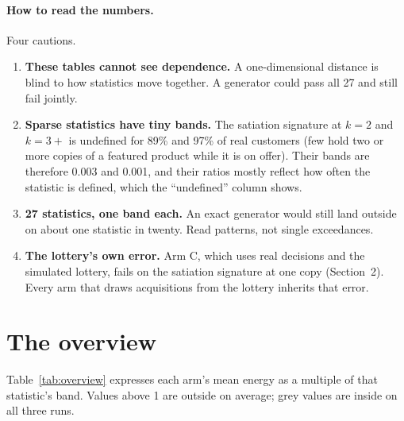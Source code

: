 \documentclass[11pt]{article}
\begin{document}
\paragraph{How to read the numbers.} Four cautions.
\begin{enumerate}
\item \textbf{These tables cannot see dependence.} A one-dimensional distance
  is blind to how statistics move together. A generator could pass all 27 and
  still fail jointly.
\item \textbf{Sparse statistics have tiny bands.} The satiation signature at
  $k = 2$ and $k = 3{+}$ is undefined for 89\% and 97\% of real customers (few
  hold two or more copies of a featured product while it is on offer). Their
  bands are therefore 0.003 and 0.001, and their ratios mostly reflect how often
  the statistic is defined, which the ``undefined'' column shows.
\item \textbf{27 statistics, one band each.} An exact generator would still land
  outside on about one statistic in twenty. Read patterns, not single
  exceedances.
\item \textbf{The lottery's own error.} Arm C, which uses real decisions and the
  simulated lottery, fails on the satiation signature at one copy (Section~2).
  Every arm that draws acquisitions from the lottery inherits that error.
\end{enumerate}

\section{The overview}

Table~\ref{tab:overview} expresses each arm's mean energy as a multiple of that
statistic's band. Values above 1 are outside on average; grey values are inside
on all three runs.

\begin{table}[h]
\centering
\small
\caption{Mean energy over three runs, in multiples of each statistic's
real-vs-real band. Grey: inside the band on every run. Bottom row: statistics
outside the band on every run.}
\label{tab:overview}

\end{table}
\end{document}
